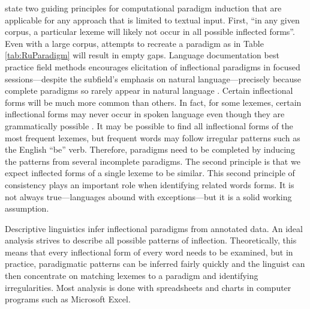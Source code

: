 \documentclass[12pt]{article}
\begin{document}
 state two guiding principles for computational paradigm induction that are applicable for any approach that is limited to textual input. First, ``in any given corpus, a particular lexeme will likely not occur in all possible inflected forms''.  Even with a large corpus, attempts to recreate a paradigm as in Table \ref{tab:RuParadigm} will result in empty gaps. Language documentation best practice field methods encourages elicitation of inflectional paradigms in focused sessions---despite the subfield's emphasis on natural language---precisely because complete paradigms so rarely appear in natural language \cite{lupke_data_2010}. Certain inflectional forms will be much more common than others. In fact, for some lexemes, certain inflectional forms may never occur in spoken language even though they are grammatically possible \cite{silfverberg_encoder-decoder_2018}. It may be possible to find all inflectional forms of the most frequent lexemes, but frequent words may follow irregular patterns such as the English ``be'' verb. Therefore, paradigms need to be completed by inducing the patterns from several incomplete paradigms. The second principle is that we expect inflected forms of a single lexeme to be similar. This second principle of consistency plays an important role when identifying related words forms. It is not always true---languages abound with exceptions---but it is a solid working assumption.  

Descriptive linguistics infer inflectional paradigms from annotated data. An ideal analysis strives to describe all possible patterns of inflection. Theoretically, this means that every inflectional form of every word needs to be examined, but in practice, paradigmatic patterns can be inferred fairly quickly and the linguist can then concentrate on matching lexemes to a paradigm and identifying irregularities. Most analysis is done with spreadsheets and charts in computer programs such as Microsoft Excel. 
\end{document}
